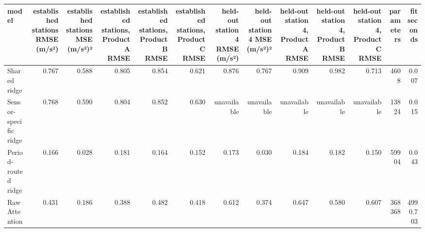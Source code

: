 \begin{tabular}{lrrrrrrrrrrrr}
\toprule
model & established stations RMSE (m/s²) & established stations MSE (m/s²)² & established stations, Product A RMSE & established stations, Product B RMSE & established stations, Product C RMSE & held-out station 4 RMSE (m/s²) & held-out station 4 MSE (m/s²)² & held-out station 4, Product A RMSE & held-out station 4, Product B RMSE & held-out station 4, Product C RMSE & parameters & fit seconds \\
\midrule
Shared ridge & 0.767 & 0.588 & 0.805 & 0.854 & 0.621 & 0.876 & 0.767 & 0.909 & 0.982 & 0.713 & 4608 & 0.007 \\
Sensor-specific ridge & 0.768 & 0.590 & 0.804 & 0.852 & 0.630 & unavailable & unavailable & unavailable & unavailable & unavailable & 13824 & 0.015 \\
Period-routed ridge & 0.166 & 0.028 & 0.181 & 0.164 & 0.152 & 0.173 & 0.030 & 0.184 & 0.182 & 0.150 & 59904 & 0.043 \\
Raw Attention & 0.431 & 0.186 & 0.388 & 0.482 & 0.418 & 0.612 & 0.374 & 0.647 & 0.580 & 0.607 & 368368 & 4990.703 \\
\bottomrule
\end{tabular}
